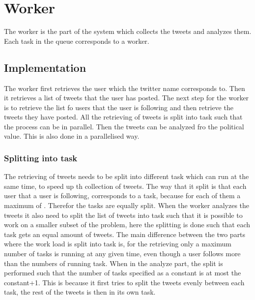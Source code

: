\chapter{Worker}
The worker is the part of the system which collects the tweets and analyzes
them. Each task in the queue corresponds to a worker. 

\section{Implementation}
The worker first retrieves the user which the twitter name corresponds to. Then
it retrieves a list of tweets that the user has posted. The next step for the
worker is to retrieve the list fo users that the user is following and then
retrieve the tweets they have posted. All the retrieving of tweets is split
into task such that the process can be in parallel. Then the tweets can be
analyzed fro the political value. This is also done in a parallelised way.

\subsection{Splitting into task}
The retrieving of tweets needs to be split into different task which can run at
the same time, to speed up th collection of tweets. The way that it split is
that each user that a user is following, corresponds to a task, because for each
of them a maximum of . Therefor the tasks are equally split.
When the worker analyzes the tweets it also need to split the list of tweets
into task such that it is possible to work on a smaller subset of the problem, here
the splitting is done such that each task gets an equal amount of tweets. The
main difference between the two parts where the work load is split into task is,
for the retrieving only a maximum number of tasks is running at any given time,
even though a user follows more than the numbers of running task. When in the
analyze part, the split is performed such that the number of tasks specified as
a constant is at most the constant+1. This is because it first tries to split
the tweets evenly between each task, the rest of the tweets is then in its own
task.

